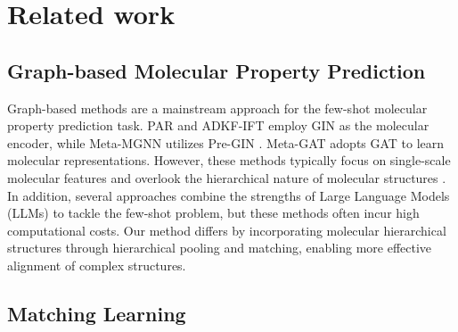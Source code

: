 \section{Related work}
\label{releted work}
% 
\subsection{Graph-based Molecular Property Prediction}
\label{subsection:releted_work_graph_based_MPP}

Graph-based methods are a mainstream approach for the few-shot molecular property prediction task. PAR \citep{wang2021propertyaware} and ADKF-IFT \citep{chen2023metalearning} employ GIN \citep{xu2018how} as the molecular encoder, while Meta-MGNN \citep{guo2021few} utilizes Pre-GIN \citep{hu2020strategies}. Meta-GAT \citep{lv2024meta} adopts GAT \citep{velivckovic2018graph} to learn molecular representations. However, these methods typically focus on single-scale molecular features and overlook the hierarchical nature of molecular structures \citep{altae2017low, ren2018meta, zhuang2023graph}.
In addition, several approaches \citep{zhao2023gimlet, liu2024moleculargpt} combine the strengths of Large Language Models (LLMs) to tackle the few-shot problem, but these methods often incur high computational costs.
Our method differs by incorporating molecular hierarchical structures through hierarchical pooling and matching, enabling more effective alignment of complex structures. 


\subsection{Matching Learning}
\label{matching_learning}

